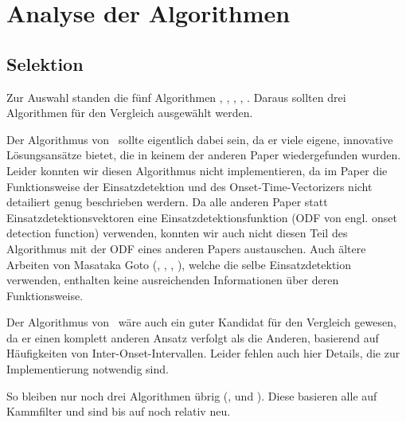 \chapter{Analyse der Algorithmen}
\label{analyse}

\section{Selektion}
{
	Zur Auswahl standen die fünf Algorithmen \cite{2000_Di}, \cite{2001_Go}, \cite{2001_BeatThis}, \cite{2009_DaPlSt}, \cite{2011_PlRoSt}.
	Daraus sollten drei Algorithmen für den Vergleich ausgewählt werden.

	Der Algorithmus von~\cite{2001_Go} sollte eigentlich dabei sein,
		da er viele eigene, innovative Lösungsansätze bietet,
		die in keinem der anderen Paper wiedergefunden wurden.
	Leider konnten wir diesen Algorithmus nicht implementieren,
		da im Paper die Funktionsweise der Einsatzdetektion und des Onset-Time-Vectorizers
		nicht detailiert genug beschrieben werdern.
	Da alle anderen Paper statt Einsatzdetektionsvektoren eine Einsatzdetektionsfunktion (ODF von engl. onset detection function) verwenden,
		konnten wir auch nicht diesen Teil des Algorithmus mit der ODF eines anderen Papers austauschen.
	Auch ältere Arbeiten von Masataka Goto (\cite{1994_GoMu}, \cite{1995_GoMu1}, \cite{1996_GoMu}, \cite{1997_GoMu2}),
		welche die selbe Einsatzdetektion verwenden,
		enthalten keine ausreichenden Informationen über deren Funktionsweise.

	Der Algorithmus von~\cite{2000_Di} wäre auch ein guter Kandidat für den Vergleich gewesen,
		da er einen komplett anderen Ansatz verfolgt als die Anderen,
		basierend auf Häufigkeiten von Inter-Onset-Intervallen.
	Leider fehlen auch hier Details,
		die zur Implementierung notwendig sind.

	So bleiben nur noch drei Algorithmen übrig (\cite{2001_BeatThis}, \cite{2009_DaPlSt} und \cite{2011_PlRoSt}).
	Diese basieren alle auf Kammfilter und sind bis auf \cite{2001_BeatThis} noch relativ neu.
}

